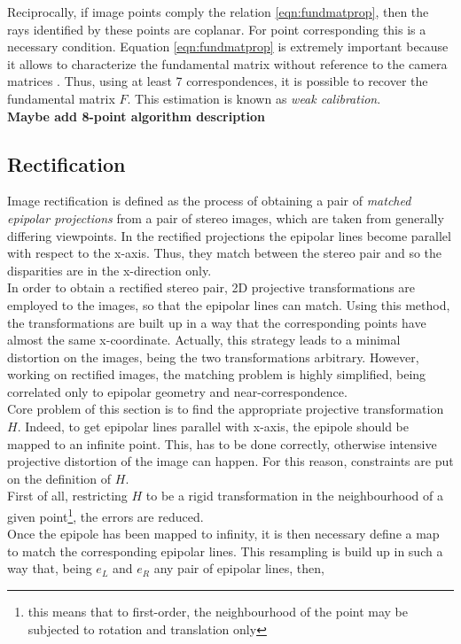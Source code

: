 Reciprocally, if image points comply the relation \ref{eqn:fundmatprop}, then the rays identified by these points are coplanar. 
For point corresponding this is a necessary condition.
Equation \ref{eqn:fundmatprop} is extremely important because it allows to characterize the fundamental matrix without reference to the camera matrices \cite{hartley2004multiple}.
Thus, using at least 7 correspondences, it is possible to recover the fundamental matrix $F$. 
This estimation is known as \textit{weak calibration}.\\
\textbf{Maybe add 8-point algorithm description}

\subsection{Rectification}
\label{subsec:rectification}

Image rectification is defined as the process of obtaining a pair of \textit{matched epipolar projections} from a pair of stereo images, which are taken from generally differing viewpoints.
In the rectified projections the epipolar lines become parallel with respect to the x-axis. 
Thus, they match between the stereo pair and so the disparities are in the x-direction only.\\
In order to obtain a rectified stereo pair, 2D projective transformations are employed to the images, so that the epipolar lines can match.
Using this method, the transformations are built up in a way that the corresponding points have almost the same x-coordinate.
Actually, this strategy leads to a minimal distortion on the images, being the two transformations arbitrary. 
However, working on rectified images, the matching problem is highly simplified, being correlated only to epipolar geometry and near-correspondence. \\
Core problem of this section is to find the appropriate projective transformation $H$. 
Indeed, to get epipolar lines parallel with x-axis, the epipole should be mapped to an infinite point. 
This, has to be done correctly, otherwise intensive projective distortion of the image can happen.
For this reason, constraints are put on the definition of $H$.\\
First of all, restricting $H$ to be a rigid transformation in the neighbourhood of a given point\footnote{this means that to first-order, the neighbourhood of the point may be subjected to rotation and translation only}, the errors are reduced.\\
Once the epipole has been mapped to infinity, it is then necessary define a map to match the corresponding epipolar lines.
This resampling is build up in such a way that, being $e_L$ and $e_R$ any pair of epipolar lines, then,

